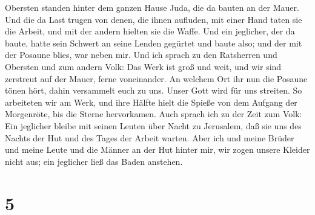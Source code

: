 Obersten standen hinter dem ganzen Hause Juda,  die da
bauten an der Mauer. Und die da Last trugen von denen, die ihnen
aufluden, mit einer Hand taten sie die Arbeit, und mit der andern
hielten sie die Waffe.  Und ein jeglicher, der da baute,
hatte sein Schwert an seine Lenden gegürtet und baute also; und der mit
der Posaune blies, war neben mir.  Und ich sprach zu den
Ratsherren und Obersten und zum andern Volk: Das Werk ist groß und weit,
und wir sind zerstreut auf der Mauer, ferne voneinander. 
An welchem Ort ihr nun die Posaune tönen hört, dahin versammelt euch zu
uns. Unser Gott wird für uns streiten.  So arbeiteten wir
am Werk, und ihre Hälfte hielt die Spieße von dem Aufgang der
Morgenröte, bis die Sterne hervorkamen.  Auch sprach ich zu
der Zeit zum Volk: Ein jeglicher bleibe mit seinen Leuten über Nacht zu
Jerusalem, daß sie uns des Nachts der Hut und des Tages der Arbeit
warten.  Aber ich und meine Brüder und meine Leute und die
Männer an der Hut hinter mir, wir zogen unsere Kleider nicht aus; ein
jeglicher ließ das Baden anstehen.

\hypertarget{section-4}{%
\section{5}\label{section-4}}

